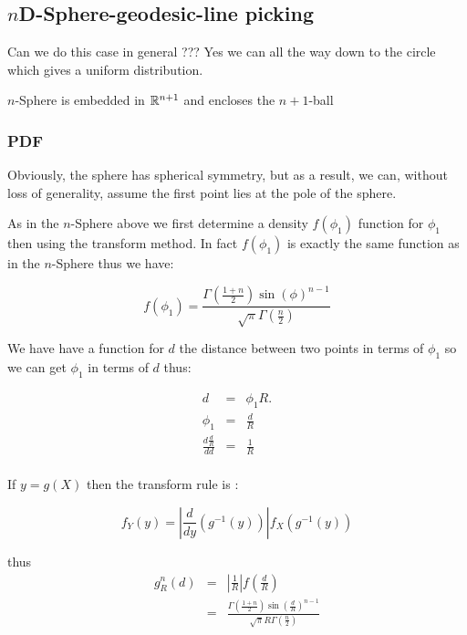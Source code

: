 \subsection{$n$D-Sphere-geodesic-line picking}
\label{sec:nsphere_geodesic_line}

Can we do this case in general ??? Yes we can all the way down to the circle which gives a uniform distribution.

$n$-Sphere is embedded in $\mathbb{R}^{n+1}$ and encloses the $n+1$-ball

\subsubsection{PDF}

Obviously, the sphere has spherical symmetry, but as a result, we can,
without loss of generality, assume the first point lies at the pole of
the sphere.

As in the $n$-Sphere above we first determine a density $f(\phi_1)$ function for $\phi_1$ then using the transform method. In fact $f(\phi_1)$ is exactly the same function as in the  $n$-Sphere thus we have:

\begin{equation}  
 f(\phi_1) = \frac{\Gamma\left(\frac{1+n}{2}\right) \sin(\phi )^{n - 1}}{\sqrt{\pi } \Gamma\left(\frac{n}{2}\right)}
\end{equation} 

We have have a function for $d$ the distance between two points in terms of $\phi_1$ so we can get  $\phi_1$ in terms of $d$ thus:

\begin{eqnarray}
  d & = & \phi_1  R.\\
\phi_1& = & \frac{d}{R}\\ 
   \frac {d \frac{d}{R}}{dd} & = & \frac{1}{R}\\
\end{eqnarray}



If $y = g(X)$ then the transform rule  is :  

\[ f_Y(y) = \left| \frac{d}{dy} \left( g^{-1}(y) \right) \right|
                f_X\left( g^{-1}(y) \right)
\]

thus 
\begin{eqnarray}
g_{R}^{n}(d) & = &  \left|\frac{1}{R}\right|  f\left(\frac{d}{R} \right)\\
 & = &\frac{\Gamma\left(\frac{1+n}{2}\right) \sin\left(\frac{d}{R}\right)^{n-1}}{\sqrt{\pi } R \Gamma\left(\frac{n}{2}\right)}
\end{eqnarray}

